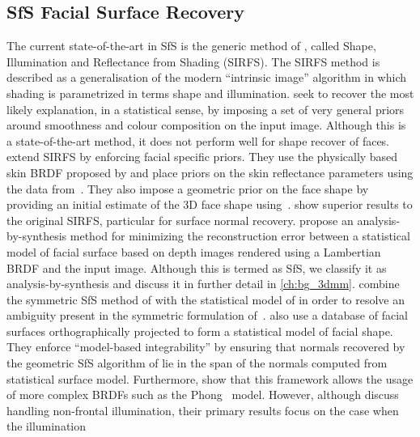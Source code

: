 \subsection{SfS Facial Surface Recovery}
The current state-of-the-art in SfS is the generic method of
\citet{barron2015shape}, called
Shape, Illumination and Reflectance from Shading (SIRFS). The SIRFS method is
described as a generalisation of the modern ``intrinsic image'' algorithm in
which shading is parametrized in terms shape and illumination.
\citet{barron2015shape} seek to recover the most likely explanation, in a
statistical sense, by imposing a set of very general priors around smoothness
and colour composition on the input image. Although this is a state-of-the-art
method, it does not perform well for shape recover of faces.
\citet{li2014intrinsic} extend SIRFS by enforcing facial specific priors. They
use the physically based skin BRDF proposed by \citet{weyrich2006analysis} and
place priors on the skin reflectance parameters using the data
from~\cite{weyrich2006analysis}. They also impose a geometric prior on the face
shape by providing an initial estimate of the 3D face shape
using~\cite{Yang:2011gj}. \citet{li2014intrinsic} show superior results to the
original SIRFS, particular for surface normal recovery.
\citet{atick1996statistical} propose an analysis-by-synthesis method
for minimizing the reconstruction error between a statistical model of facial
surface based on depth images rendered using a Lambertian BRDF and the input
image. Although this is termed as SfS, we classify it as analysis-by-synthesis
and discuss it in further detail in \cref{ch:bg_3dmm}.
\citet{dovgard2004statistical} combine the symmetric SfS method of
\citet{yilmaz2002estimation} with the statistical model of
\citet{atick1996statistical} in order to resolve an ambiguity present in
the symmetric formulation of~\cite{yilmaz2002estimation}.
\citet{smith2010estimating} also use a database of facial surfaces
orthographically projected to form a statistical model of facial shape. They
enforce ``model-based integrability'' by ensuring that normals recovered
by the geometric SfS algorithm of \citet{worthington1999new,Smith:2007eb} lie
in the span of the normals computed from statistical surface model. Furthermore,
\citet{smith2010estimating} show that this framework allows the usage of
more complex BRDFs such as the Phong~\cite{tuong1973illumination} model.
However, although \citet{smith2010estimating} discuss handling non-frontal
illumination, their primary results focus on the case when the illumination
